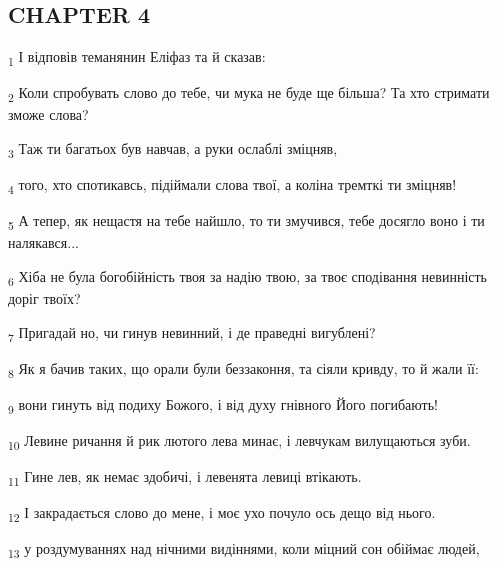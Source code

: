 \subsection{CHAPTER 4}
\begin{tcolorbox}
\textsubscript{1} І відповів теманянин Еліфаз та й сказав:
\end{tcolorbox}
\begin{tcolorbox}
\textsubscript{2} Коли спробувать слово до тебе, чи мука не буде ще більша? Та хто стримати зможе слова?
\end{tcolorbox}
\begin{tcolorbox}
\textsubscript{3} Таж ти багатьох був навчав, а руки ослаблі зміцняв,
\end{tcolorbox}
\begin{tcolorbox}
\textsubscript{4} того, хто спотикавсь, підіймали слова твої, а коліна тремткі ти зміцняв!
\end{tcolorbox}
\begin{tcolorbox}
\textsubscript{5} А тепер, як нещастя на тебе найшло, то ти змучився, тебе досягло воно і ти налякався...
\end{tcolorbox}
\begin{tcolorbox}
\textsubscript{6} Хіба не була богобійність твоя за надію твою, за твоє сподівання невинність доріг твоїх?
\end{tcolorbox}
\begin{tcolorbox}
\textsubscript{7} Пригадай но, чи гинув невинний, і де праведні вигублені?
\end{tcolorbox}
\begin{tcolorbox}
\textsubscript{8} Як я бачив таких, що орали були беззаконня, та сіяли кривду, то й жали її:
\end{tcolorbox}
\begin{tcolorbox}
\textsubscript{9} вони гинуть від подиху Божого, і від духу гнівного Його погибають!
\end{tcolorbox}
\begin{tcolorbox}
\textsubscript{10} Левине ричання й рик лютого лева минає, і левчукам вилущаються зуби.
\end{tcolorbox}
\begin{tcolorbox}
\textsubscript{11} Гине лев, як немає здобичі, і левенята левиці втікають.
\end{tcolorbox}
\begin{tcolorbox}
\textsubscript{12} І закрадається слово до мене, і моє ухо почуло ось дещо від нього.
\end{tcolorbox}
\begin{tcolorbox}
\textsubscript{13} у роздумуваннях над нічними видіннями, коли міцний сон обіймає людей,
\end{tcolorbox}
